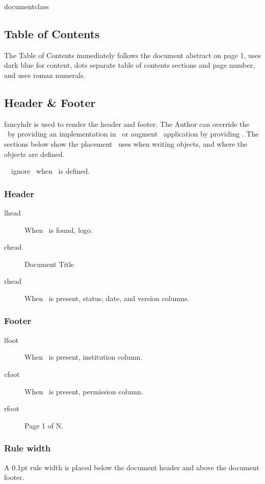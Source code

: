 documentclass\documentclass[12pt]{tlc-article}
\begin{document}
\subsection{Table of Contents}
The Table of Contents immediately follows the document abstract on page 1, uses
dark blue for content, dots separate table of contents sections and page number,
and uses roman numerals.

\subsection{Header \& Footer}
fancyhdr is used to render the header and footer.  The Author can override the
\tlcA\ by providing an implementation in \tlcHF\, or augment \tlcA\ 
application by providing \tlcVE. The sections below show the placement \tlcA\
uses when writing objects, and where the objects are defined.

\tlcNote\ \tlcA\ ignore \tlcVE\ when \tlcHF\ is defined.

\subsubsection*{Header}

\begin{description}
  \item[lhead] When \tlcLG\ is found, logo.
  \item[chead] Document Title
  \item[rhead] When \tlcVE\ is present, status, date, and version columns.
\end{description}

\subsubsection*{Footer}

\begin{description}
  \item[lfoot] When \tlcVE\ is present, institution column. 
  \item[cfoot] When \tlcVE\ is present, permission column. 
  \item[rfoot] Page 1 of N.
\end{description}

\subsubsection*{Rule width}
A 0.1pt rule width is placed below the document header and above the document
footer.
\end{document}
